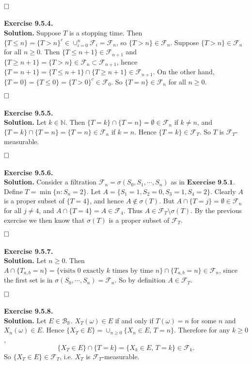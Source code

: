\documentclass[12pt]{extarticle}
\begin{document}
$\hspace{\fill}\square$
\\ \\
\textbf{Exercise 9.5.4.}\\
\textbf{Solution.} Suppose $T$ is a stopping time. Then $\{T\leq n\}=\{T>n\}^c\in\cup_{i=0}^n\mathcal{F}_i=\mathcal{F}_n$, so $\{T>n\}\in\mathcal{F}_n$. Suppose $\{T>n\}\in\mathcal{F}_n$ for all $n\geq 0$. Then $\{T\leq n+1\}\in\mathcal{F}_{n+1}$ and $\{T\geq n+1\}=\{T>n\}\in\mathcal{F}_n\subset\mathcal{F}_{n+1}$, hence $\{T=n+1\}=\{T\leq n+1\}\cap\{T\geq n+1\}\in\mathcal{F}_{n+1}$. On the other hand, $\{T=0\}=\{T\leq 0\}=\{T>0\}^c\in\mathcal{F}_0$. So $\{T=n\}\in\mathcal{F}_n$ for all $n\geq 0$.

$\hspace{\fill}\square$
\\ \\
\textbf{Exercise 9.5.5.}
\\
\textbf{Solution.} Let $k\in\mathbb{N}$. Then $\{T=k\}\cap\{T=n\}=\emptyset\in\mathcal{F}_n$ if $k\neq n$, and $\{T=k\}\cap\{T=n\}=\{T=n\}\in\mathcal{F}_n$ if $k=n$. Hence $\{T=k\}\in\mathcal{F}_T$. So $T$ is $\mathcal{F}_T$-measurable.

$\hspace{\fill}\square$
\\ \\
\textbf{Exercise 9.5.6.}\\
\textbf{Solution.} Consider a filtration $\mathcal{F}_n=\sigma(S_0,S_1,\cdots,S_n)$ as in $\textbf{Exercise 9.5.1.}$ Define $T=\min\{n:S_n=2\}$. Let $A=\{S_1=1,S_2=0,S_3=1,S_4=2\}$. Clearly $A$ is a proper subset of $\{T=4\}$, and hence $A\notin\sigma(T)$. But $A\cap\{T=j\}=\emptyset\in\mathcal{F}_n$ for all $j\neq 4$, and $A\cap\{T=4\}=A\in\mathcal{F}_4$. Thus $A\in\mathcal{F}_T\setminus\sigma(T)$. By the previous exercise we then know that $\sigma(T)$ is a proper subset of $\mathcal{F}_T$.

$\hspace{\fill}\square$
\\ \\
\textbf{Exercise 9.5.7.}\\
\textbf{Solution.} Let $n\geq 0$. Then $A\cap\{T_{a,b}=n\}=\{\text{visits $0$ exactly $k$ times by time $n$}\}\cap\{T_{a,b}=n\}\in\mathcal{F}_n$, since the first set is in $\sigma(S_0,\cdots,S_n)=\mathcal{F}_n$. So by definition $A\in\mathcal{F}_T$.

$\hspace{\fill}\square$
\\ \\
\textbf{Exercise 9.5.8.}\\
\textbf{Solution.} Let $E\in\mathcal{B}_\mathbb{R}$. $X_T(\omega)\in E$ if and only if $T(\omega)=n$ for some $n$ and $X_n(\omega)\in E$. Hence $\{X_T\in E\}=\cup_{n\geq 0}\{X_n\in E,\,T=n\}$. Therefore for any $k\geq 0$,
\begin{equation*}
\{X_T\in E\}\cap\{T=k\}=\{X_k\in E,\,T=k\}\in\mathcal{F}_k.
\end{equation*}
So $\{X_T\in E\}\in\mathcal{F}_{T}$, i.e. $X_T$ is $\mathcal{F}_T$-measurable.
\end{document}

